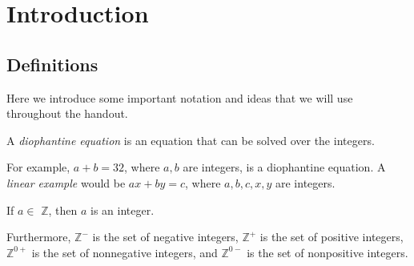 \documentclass[mast]{lucky}
\begin{document}
\section{Introduction}
\subsection{Definitions}
Here we introduce some important notation and ideas that we will use throughout the handout.

\begin{defi}

A \emph{diophantine equation} is an equation that can be solved over the integers. 
\end{defi}

For example, $a+b=32$, where $a,b$ are integers, is a diophantine equation.  A \textit{linear example} would be $ax+by=c$, where $a,b,c,x,y$ are integers.
\begin{defi}[$\mathbb{Z}$]
If $a\in$ \emph{$\mathbb{Z}$}, then $a$ is an integer.
\end{defi}
Furthermore, \emph{$\mathbb{Z}^-$} is the set of negative integers, \emph{$\mathbb{Z}^+$} is the set of positive integers, \emph{$\mathbb{Z}^{0+}$} is the set of nonnegative integers, and \emph{$\mathbb{Z}^{0-}$} is the set of nonpositive integers.
\end{document}
